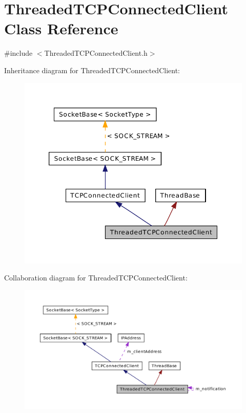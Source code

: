 \hypertarget{class_threaded_t_c_p_connected_client}{\section{Threaded\-T\-C\-P\-Connected\-Client Class Reference}
\label{class_threaded_t_c_p_connected_client}
}


{\ttfamily \#include $<$Threaded\-T\-C\-P\-Connected\-Client.\-h$>$}



Inheritance diagram for Threaded\-T\-C\-P\-Connected\-Client\-:\nopagebreak
\begin{figure}[H]
\begin{center}
\leavevmode
\includegraphics[width=350pt]{class_threaded_t_c_p_connected_client__inherit__graph}
\end{center}
\end{figure}


Collaboration diagram for Threaded\-T\-C\-P\-Connected\-Client\-:\nopagebreak
\begin{figure}[H]
\begin{center}
\leavevmode
\includegraphics[width=350pt]{class_threaded_t_c_p_connected_client__coll__graph}
\end{center}
\end{figure}
